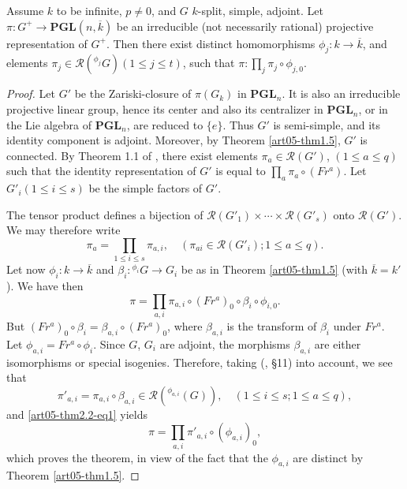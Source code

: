 \setcounter{theorem}{1}
\begin{theorem}\label{art05-thm2.2}
Assume $k$ to be infinite, $p\neq 0$, and $G$ $k$-split, simple, adjoint. Let $\pi:G^{+}\to \mathbf{PGL}(n,\overline{k})$ be an irreducible (not necessarily rational) projective representation of $G^{+}$. Then there exist distinct homomorphisms $\phi_{j}:k\to \overline{k}$, and elements $\pi_{j}\in \mathscr{R}({}^{\phi_{j}}G)(1\leq j\leq t)$, such that $\pi:\prod\limits_{j}\pi_{j}\circ \phi_{j,0}$.
\end{theorem}

\begin{proof}
Let $G'$ be the Zariski-closure of $\pi(G_{k})$ in $\mathbf{PGL}_{n}$. It is also an irreducible projective linear group, hence its center and also its centralizer in $\mathbf{PGL}_{n}$, or in the Lie algebra of $\mathbf{PGL}_{n}$, are reduced to $\{e\}$. Thus $G'$ is semi-simple, and its identity component is adjoint. Moreover, by Theorem \ref{art05-thm1.5}, $G'$ is connected. By Theorem 1.1 of \cite{art05-key9}, there exist elements $\pi_{a}\in \mathscr{R}(G')$, $(1\leq a\leq q)$ such that the identity representation of $G'$ is equal to $\prod\limits_{a}\pi_{a}\circ (Fr^{a})$. Let $G'_{i}(1\leq i\leq s)$ be the simple factors of $G'$.

The tensor product defines a bijection of $\mathscr{R}(G'_{1})\times\cdots\times \mathscr{R}(G'_{s})$ onto $\mathscr{R}(G')$. We may therefore write
$$
\pi_{a}=\prod\limits_{1\leq i\leq s}\pi_{a,i},\quad (\pi_{ai}\in \mathscr{R}(G'_{i}); 1\leq a\leq q).
$$\pageoriginale
Let now $\phi_{i}:k\to \overline{k}$ and $\beta_{i}:{}^{\phi_{i}}G\to G_{i}$ be as in Theorem \ref{art05-thm1.5} (with $\overline{k}=k'$). We have then
\setcounter{equation}{0}
\begin{equation}
\pi=\prod\limits_{a,i}\pi_{a,i}\circ (Fr^{a})_{0}\circ \beta_{i}\circ \phi_{i,0}.\label{art05-thm2.2-eq1}
\end{equation}
But $(Fr^{a})_{0}\circ \beta_{i}=\beta_{a,i}\circ (Fr^{a})_{0}$, where $\beta_{a,i}$ is the transform of $\beta_{i}$ under $Fr^{a}$. Let $\phi_{a,i}=Fr^{a}\circ \phi_{i}$. Since $G$, $G_{i}$ are adjoint, the morphisms $\beta_{a,i}$ are either isomorphisms or special isogenies. Therefore, taking (\cite{art05-key9}, \S11) into account, we see that
$$
\pi'_{a,i}=\pi_{a,i}\circ \beta_{a,i}\in \mathscr{R}({}^{\phi_{a,i}}(G)),\quad (1\leq i\leq s; 1\leq a\leq q),
$$
and \eqref{art05-thm2.2-eq1} yields
\begin{equation}
\pi=\prod\limits_{a,i}\pi'_{a,i}\circ (\phi_{a,i})_{0},\label{art05-thm2.2-eq2}
\end{equation}
which proves the theorem, in view of the fact that the $\phi_{a,i}$ are distinct by Theorem \ref{art05-thm1.5}.
\end{proof}

